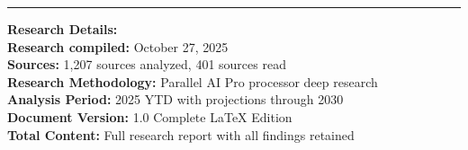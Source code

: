 \documentclass[12pt,a4paper]{article}
\begin{document}
\hrule

\vspace{0.5cm}

\begin{flushleft}
\small
\textbf{Research Details:}\\
\textbf{Research compiled:} October 27, 2025\\
\textbf{Sources:} 1,207 sources analyzed, 401 sources read\\
\textbf{Research Methodology:} Parallel AI Pro processor deep research\\
\textbf{Analysis Period:} 2025 YTD with projections through 2030\\
\textbf{Document Version:} 1.0 Complete LaTeX Edition\\
\textbf{Total Content:} Full research report with all findings retained
\end{flushleft}
\end{document}
